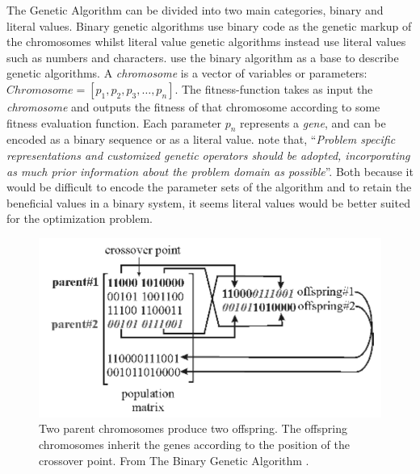 The Genetic Algorithm can be divided into two main categories, binary and literal values. Binary genetic algorithms use binary code as the genetic markup of the chromosomes whilst literal value genetic algorithms instead use literal values such as numbers and characters. \citeauthor{Haupt2004a} use the binary algorithm as a base to describe genetic algorithms. A \textit{chromosome} is a vector of variables or parameters: \(Chromosome = [p_{1},p_{2},p_{3},\dots,p_{n}]\). The fitness-function takes as input the \textit{chromosome} and outputs the fitness of that chromosome according to some fitness evaluation function. Each parameter \(p_{n}\) represents a \textit{gene}, and can be encoded as a binary sequence or as a literal value. \citeauthor[p. 93]{Brownlee2011} note that, ``\textit{Problem specific representations and customized genetic operators should be adopted, incorporating as much prior information about the problem domain as possible}''. Both because it would be difficult to encode the parameter sets of the \CTC algorithm and to retain the beneficial values in a binary system, it seems literal values would be better suited for the optimization problem.

\begin{figure}[!h]
  \begin{center}
    \includegraphics[totalheight=0.175\textheight]{figures/crossover}
  \end{center}
  \caption{Two parent chromosomes produce two offspring. The offspring chromosomes inherit the genes according to the position of the crossover point. From The Binary Genetic Algorithm \protect \cite[p. 42]{Haupt2004a}.}
  \label{fig:crossover}
\end{figure}

